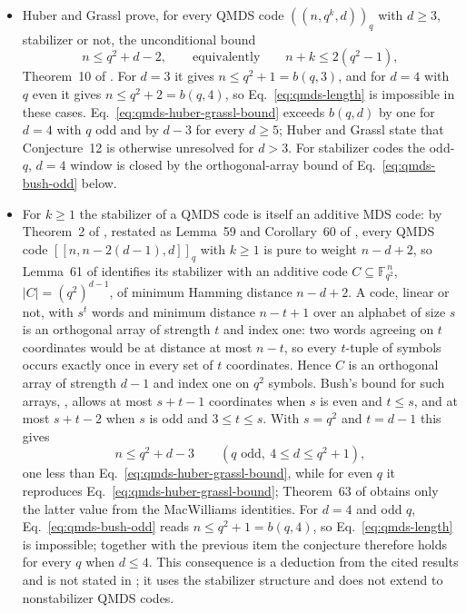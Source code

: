 \begin{itemize}
  \item Huber and Grassl prove, for every QMDS code $((n,q^{k},d))_q$ with
$d\geq3$, stabilizer or not, the unconditional bound
\begin{equation}
  n\leq q^{2}+d-2,
  \qquad\text{equivalently}\qquad
  n+k\leq 2(q^{2}-1),
  \label{eq:qmds-huber-grassl-bound}
\end{equation}
Theorem~10 of .  For $d=3$ it gives
$n\leq q^{2}+1=b(q,3)$, and for $d=4$ with $q$ even it gives
$n\leq q^{2}+2=b(q,4)$, so Eq.~\eqref{eq:qmds-length} is impossible in
these cases.  Eq.~\eqref{eq:qmds-huber-grassl-bound} exceeds $b(q,d)$ by one
for $d=4$ with $q$ odd and by $d-3$ for every $d\geq5$; Huber and Grassl
state that Conjecture~12 is otherwise unresolved for $d>3$.  For stabilizer
codes the odd-$q$, $d=4$ window is closed by the orthogonal-array bound of
Eq.~\eqref{eq:qmds-bush-odd} below.

  \item For $k\geq1$ the stabilizer of a QMDS code is itself an additive MDS
code: by Theorem~2 of , restated as
Lemma~59 and Corollary~60 of , every
QMDS code $[[n,n-2(d-1),d]]_q$ with $k\geq1$ is pure to weight $n-d+2$, so
Lemma~61 of  identifies its stabilizer
with an additive code $C\subseteq\mathbb{F}_{q^{2}}^{\,n}$, $|C|=(q^{2})^{d-1}$,
of minimum Hamming distance $n-d+2$.  A code, linear or not, with $s^{t}$
words and minimum distance $n-t+1$ over an alphabet of size $s$ is an
orthogonal array of strength $t$ and index one: two words agreeing on $t$
coordinates would be at distance at most $n-t$, so every $t$-tuple of
symbols occurs exactly once in every set of $t$ coordinates.  Hence $C$ is
an orthogonal array of strength $d-1$ and index one on $q^{2}$ symbols.
Bush's bound for such arrays, , allows at
most $s+t-1$ coordinates when $s$ is even and $t\leq s$, and at most $s+t-2$
when $s$ is odd and $3\leq t\leq s$.  With $s=q^{2}$ and $t=d-1$ this gives
\begin{equation}
  n\leq q^{2}+d-3
  \qquad(q\text{ odd},\ 4\leq d\leq q^{2}+1),
  \label{eq:qmds-bush-odd}
\end{equation}
one less than Eq.~\eqref{eq:qmds-huber-grassl-bound}, while for even $q$ it
reproduces Eq.~\eqref{eq:qmds-huber-grassl-bound}; Theorem~63 of
 obtains only the latter value from the
MacWilliams identities.  For $d=4$ and odd $q$, Eq.~\eqref{eq:qmds-bush-odd}
reads $n\leq q^{2}+1=b(q,4)$, so Eq.~\eqref{eq:qmds-length} is impossible;
together with the previous item the conjecture therefore holds for every
$q$ when $d\leq4$.  This consequence is a deduction from the cited results
and is not stated in ; it uses the
stabilizer structure and does not extend to nonstabilizer QMDS codes.


\end{itemize}
